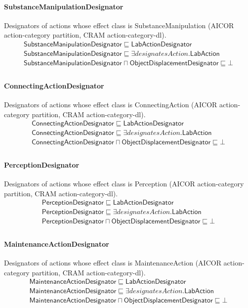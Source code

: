 \documentclass[10pt]{article}
\begin{document}
\paragraph{SubstanceManipulationDesignator} Designators of actions whose effect class is SubstanceManipulation (AICOR action-category partition, CRAM action-category-dl).
\[\begin{array}{l}
\mathsf{SubstanceManipulationDesignator} \sqsubseteq  \mathsf{LabActionDesignator} \\
\mathsf{SubstanceManipulationDesignator} \sqsubseteq  \exists \mathit{designatesAction}.\mathsf{LabAction} \\
\mathsf{SubstanceManipulationDesignator} \sqcap  \mathsf{ObjectDisplacementDesignator} \sqsubseteq  \bot  \\
\end{array}\]
\paragraph{ConnectingActionDesignator} Designators of actions whose effect class is ConnectingAction (AICOR action-category partition, CRAM action-category-dl).
\[\begin{array}{l}
\mathsf{ConnectingActionDesignator} \sqsubseteq  \mathsf{LabActionDesignator} \\
\mathsf{ConnectingActionDesignator} \sqsubseteq  \exists \mathit{designatesAction}.\mathsf{LabAction} \\
\mathsf{ConnectingActionDesignator} \sqcap  \mathsf{ObjectDisplacementDesignator} \sqsubseteq  \bot  \\
\end{array}\]
\paragraph{PerceptionDesignator} Designators of actions whose effect class is Perception (AICOR action-category partition, CRAM action-category-dl).
\[\begin{array}{l}
\mathsf{PerceptionDesignator} \sqsubseteq  \mathsf{LabActionDesignator} \\
\mathsf{PerceptionDesignator} \sqsubseteq  \exists \mathit{designatesAction}.\mathsf{LabAction} \\
\mathsf{PerceptionDesignator} \sqcap  \mathsf{ObjectDisplacementDesignator} \sqsubseteq  \bot  \\
\end{array}\]
\paragraph{MaintenanceActionDesignator} Designators of actions whose effect class is MaintenanceAction (AICOR action-category partition, CRAM action-category-dl).
\[\begin{array}{l}
\mathsf{MaintenanceActionDesignator} \sqsubseteq  \mathsf{LabActionDesignator} \\
\mathsf{MaintenanceActionDesignator} \sqsubseteq  \exists \mathit{designatesAction}.\mathsf{LabAction} \\
\mathsf{MaintenanceActionDesignator} \sqcap  \mathsf{ObjectDisplacementDesignator} \sqsubseteq  \bot  \\
\end{array}\]
\end{document}
